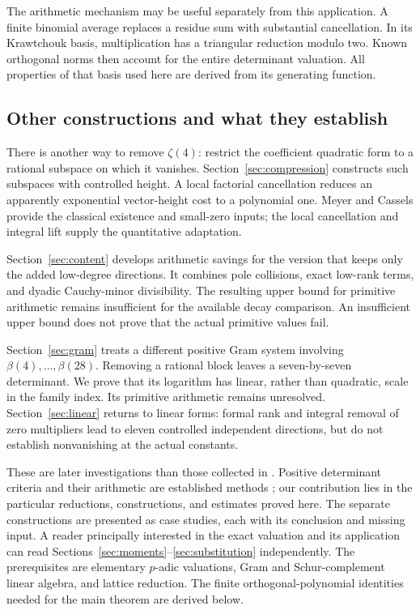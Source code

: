 The arithmetic mechanism may be useful separately from this application.
A finite binomial average replaces a residue sum with substantial
cancellation. In its Krawtchouk basis, multiplication has a triangular
reduction modulo two. Known orthogonal norms then account for the
entire determinant valuation. All properties of that basis used here
are derived from its generating function.

\subsection{Other constructions and what they establish}
There is another way to remove $\zeta(4)$: restrict the coefficient
quadratic form to a rational subspace on which it vanishes.
Section~\ref{sec:compression} constructs such subspaces with controlled
height. A local factorial cancellation reduces an apparently exponential
vector-height cost to a polynomial one. Meyer and Cassels provide the
classical existence and small-zero inputs; the local cancellation and
integral lift supply the quantitative adaptation.

Section~\ref{sec:content} develops arithmetic savings for the version
that keeps only the added low-degree directions. It combines pole
collisions, exact low-rank terms, and dyadic Cauchy-minor divisibility.
The resulting upper bound for primitive arithmetic remains insufficient
for the available decay comparison. An insufficient upper bound does
not prove that the actual primitive values fail.

Section~\ref{sec:gram} treats a different positive Gram system involving
$\beta(4),\ldots,\beta(28)$. Removing a rational block leaves a
seven-by-seven determinant. We prove that its logarithm has linear,
rather than quadratic, scale in the family index. Its primitive
arithmetic remains unresolved. Section~\ref{sec:linear} returns to
linear forms: formal rank and integral removal of zero multipliers
lead to eleven controlled independent directions, but do not establish
nonvanishing at the actual constants.

These are later investigations than those collected in
\cite{firstsupp,furthersupp}. Positive determinant criteria and their
arithmetic are established methods \cite{Zudilin}; our contribution
lies in the particular reductions, constructions, and estimates proved
here. The separate constructions are presented as case studies, each
with its conclusion and missing input. A reader principally interested
in the exact valuation and its application can read
Sections~\ref{sec:moments}--\ref{sec:substitution} independently.
The prerequisites are elementary $p$-adic valuations, Gram and
Schur-complement linear algebra, and lattice reduction. The finite
orthogonal-polynomial identities needed for the main theorem are
derived below.

